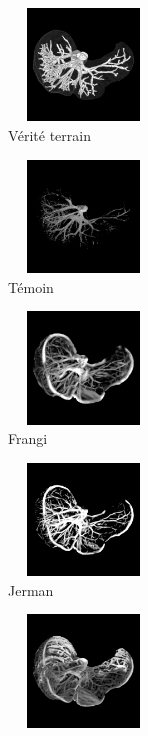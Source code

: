 \begin{figure}[!ht]
  \captionsetup[subfigure]{justification=centering}
  \begin{subfigure}[t]{0.32\textwidth}
  \includegraphics[clip = true, trim  =  10 150 10 150, height=3cm,width=4cm]{Images/Ircad_GT.png}
  \caption{Vérité terrain}
  \end{subfigure}
  \begin{subfigure}[t]{0.32\textwidth}
  \includegraphics[clip = true, trim  =  10 150 10 150, height=3cm,width=4cm]{Images/Ircad_Baseline.png}
  \caption{Témoin}
  \end{subfigure}
  \begin{subfigure}[t]{0.32\textwidth}
  \includegraphics[clip = true, trim  =  10 150 10 150, height=3cm,width=4cm]{Images/Ircad_Frangi.png}
  \caption{Frangi}
  \end{subfigure}
  \begin{subfigure}[t]{0.32\textwidth}
  \includegraphics[clip = true, trim  =  10 150 10 150, height=3cm,width=4cm]{Images/Ircad_Jerman.png}
  \caption{Jerman}
  \end{subfigure}
  \begin{subfigure}[t]{0.32\textwidth}
  \includegraphics[clip = true, trim  =  10 150 10 150, height=3cm,width=4cm]{Images/Ircad_OOF_GM.png}

\end{subfigure}
\end{figure}
